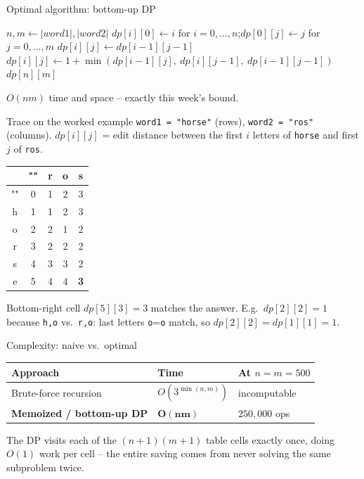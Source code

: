 \documentclass[11pt,aspectratio=169]{beamer}
\begin{document}
\begin{frame}{Optimal algorithm: bottom-up DP}
  \footnotesize
  \begin{algorithmic}[1]
      \State $n, m \gets |word1|, |word2|$
      \State $dp[i][0] \gets i$ for $i=0,\dots,n$;\quad $dp[0][j] \gets j$ for
      $j=0,\dots,m$
            \State $dp[i][j] \gets dp[i-1][j-1]$
          \Else
            \State $dp[i][j] \gets 1 + \min(dp[i-1][j],\ dp[i][j-1],\ dp[i-1][j-1])$
          \EndIf
        \EndFor
      \EndFor
      \State \Return $dp[n][m]$
    \EndFunction
  \end{algorithmic}
  $O(nm)$ time and space -- exactly this week's bound.
\end{frame}

\begin{frame}{Trace on the worked example}
  \small
  \texttt{word1 = "horse"} (rows), \texttt{word2 = "ros"} (columns). $dp[i][j]$ = edit
  distance between the first $i$ letters of \texttt{horse} and first $j$ of \texttt{ros}.
  \begin{center}
  \begin{tabular}{@{}c|cccc@{}}
     & "" & r & o & s \\
    \midrule
    "" & 0 & 1 & 2 & 3 \\
    h & 1 & 1 & 2 & 3 \\
    o & 2 & 2 & 1 & 2 \\
    r & 3 & 2 & 2 & 2 \\
    s & 4 & 3 & 3 & 2 \\
    e & 5 & 4 & 4 & \textbf{3} \\
  \end{tabular}
  \end{center}
  Bottom-right cell $dp[5][3]=3$ matches the answer. E.g.\ $dp[2][2]=1$ because
  \texttt{h,o} vs.\ \texttt{r,o}: last letters \texttt{o}=\texttt{o} match, so
  $dp[2][2]=dp[1][1]=1$.
\end{frame}

\begin{frame}{Complexity: naive vs.\ optimal}
  \begin{center}
  \begin{tabular}{@{}lll@{}}
    \toprule
    Approach & Time & At $n=m=500$ \\
    \midrule
    Brute-force recursion & $O(3^{\min(n,m)})$ & incomputable \\
    \textbf{Memoized / bottom-up DP} & $\boldsymbol{O(nm)}$ & $250{,}000$ ops \\
    \bottomrule
  \end{tabular}
  \end{center}
  The DP visits each of the $(n{+}1)(m{+}1)$ table cells exactly once, doing $O(1)$ work
  per cell -- the entire saving comes from never solving the same subproblem twice.
\end{frame}
\end{document}
